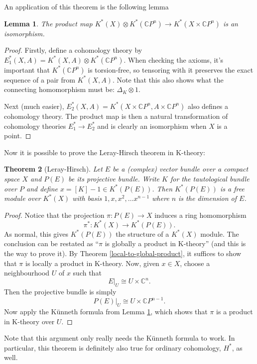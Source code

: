 \documentclass[a4paper,10pt]{article}
\theoremstyle{plain}%
\newtheorem{thm}{Theorem}
\newtheorem{lem}[thm]{Lemma}
\theoremstyle{definition}
\theoremstyle{remark}
\newcommand{\CC}{\mathbb{C}}
\newcommand{\cp}{\CC P}   %
\newcommand{\CP}{\cp}     %
\begin{document}
An application of this theorem is the following lemma
\begin{lem}\label{kxcpn-kunneth}
  The product map $K^*(X)\otimes K^*(\CP^n) \to K^*(X\times \CP^n)$ is
  an isomorphism.
\end{lem}
\begin{proof}
  Firstly, define a cohomology theory by $E_1^*(X,A) = K^*(X,A)\otimes
  K^*(\CP^n)$. When checking the axioms, it's important that
  $K^*(\CP^n)$ is torsion-free, so tensoring with it preserves the
  exact sequence of a pair from $K^*(X,A)$. Note that this also shows
  what the connecting homomorphism must be: $\Delta_K\otimes 1$.

  Next (much easier), $E_2^*(X,A) = K^*(X\times \CP^n, A\times \CP^n)$
  also defines a cohomology theory. The product map is then a natural
  transformation of cohomology theories $E_1^*\to E_2^*$ and is
  clearly an isomorphism when $X$ is a point.
\end{proof}

Now it is possible to prove the Leray-Hirsch theorem in K-theory:
\begin{thm}[Leray-Hirsch]
  \label{leray-hirsch}
  Let $E$ be a (complex) vector bundle over a compact space $X$ and
  $P(E)$ be its projective bundle. Write $K$ for the tautological
  bundle over $P$ and define $x = [K] - 1 \in K^*(P(E))$. Then
  $K^*(P(E))$ is a free module over $K^*(X)$ with basis $1,x,x^2,\dots
  x^{n-1}$ where $n$ is the dimension of $E$.
\end{thm}
\begin{proof}
  Notice that the projection $\pi: P(E)\to X$ induces a ring
  homomorphism
  \begin{equation*}
    \pi^*: K^*(X)\to K^*(P(E)).
  \end{equation*}
  As normal, this gives $K^*(P(E))$ the structure of a $K^*(X)$
  module. The conclusion can be restated as ``$\pi$ is globally a
  product in K-theory'' (and this is the way to prove it). By Theorem
  \ref{local-to-global-product}, it suffices to show that $\pi$ is
  locally a product in K-theory. Now, given $x\in X$, choose a
  neighbourhood $U$ of $x$ such that
  \begin{equation*}
    E|_U \cong U \times \CC^n.
  \end{equation*}
  Then the projective bundle is simply
  \begin{equation*}
    P(E)|_U \cong U \times \CP^{n-1}.
  \end{equation*}
  Now apply the K\"unneth formula from Lemma \ref{kxcpn-kunneth},
  which shows that $\pi$ is a product in K-theory over $U$.
\end{proof}
Note that this argument only really needs the K\"unneth formula to
work. In particular, this theorem is definitely also true for ordinary
cohomology, $H^*$, as well.
\end{document}
